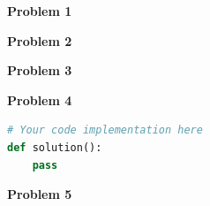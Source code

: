 \documentclass[11pt]{article}
\begin{document}



{\Large\textbf{Problem 1}}
\vspace{4pt}
\begin{questionbox}
\end{questionbox}
\vspace{6pt}
\begin{answerbox}
\end{answerbox}

\vspace{20pt}

{\Large\textbf{Problem 2}}
\vspace{4pt}
\begin{questionbox}
\end{questionbox}
\vspace{6pt}
\begin{answerbox}
\end{answerbox}

\vspace{20pt}

{\Large\textbf{Problem 3}}
\vspace{4pt}
\begin{questionbox}
\end{questionbox}
\vspace{6pt}
\begin{proofbox}
\end{proofbox}

\vspace{20pt}

{\Large\textbf{Problem 4}}
\vspace{4pt}
\begin{questionbox}
\end{questionbox}
\vspace{6pt}
\begin{algorithmbox}
\end{algorithmbox}
\vspace{6pt}
\begin{codebox}
\begin{lstlisting}[language=Python]
# Your code implementation here
def solution():
    pass
\end{lstlisting}
\end{codebox}

\vspace{20pt}

{\Large\textbf{Problem 5}}
\vspace{4pt}
\begin{questionbox}
\end{questionbox}
\vspace{6pt}
\begin{answerbox}
\end{answerbox}
\end{document}
